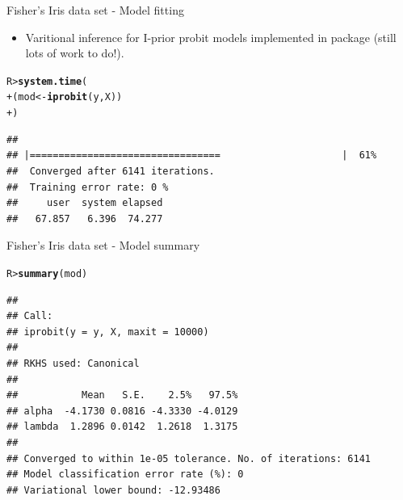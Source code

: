 \documentclass{beamer}\usepackage[]{graphicx}\usepackage[]{color}
\makeatletter
\newcommand{\hlstd}[1]{\textcolor[rgb]{0.345,0.345,0.345}{#1}}%
\newcommand{\hlkwb}[1]{\textcolor[rgb]{0.69,0.353,0.396}{#1}}%
\newcommand{\hlkwd}[1]{\textcolor[rgb]{0.737,0.353,0.396}{\textbf{#1}}}%
\newenvironment{kframe}{%
 \def\at@end@of@kframe{}%
 \ifinner\ifhmode%
  \def\at@end@of@kframe{\end{minipage}}%
  \begin{minipage}{\columnwidth}%
 \fi\fi%
 \def\FrameCommand##1{\hskip\@totalleftmargin \hskip-\fboxsep
 \colorbox{shadecolor}{##1}\hskip-\fboxsep
     \hskip-\linewidth \hskip-\@totalleftmargin \hskip\columnwidth}%
 \MakeFramed {\advance\hsize-\width
   \@totalleftmargin\z@ \linewidth\hsize
   \@setminipage}}%
 {\par\unskip\endMakeFramed%
 \at@end@of@kframe}
\newenvironment{knitrout}{}{} %
\makeatother
\begin{document}
\begin{frame}[fragile]{Fisher's Iris data set - Model fitting}
\vspace{-13pt}
\begin{itemize}
\item Varitional inference for I-prior probit models implemented in  package  (still lots of work to do!).
\end{itemize}
\begin{knitrout}\small
{}\color{fgcolor}\begin{kframe}
\begin{alltt}
\hlstd{R> }\hlkwd{system.time}\hlstd{(}
\hlstd{+ }  \hlstd{(mod} \hlkwb{<-} \hlkwd{iprobit}\hlstd{(y, X))}
\hlstd{+ }\hlstd{)}
\end{alltt}
\end{kframe}
\end{knitrout}
\vspace{-25pt}
\begin{knitrout}\small
{}\color{fgcolor}\begin{kframe}
\begin{alltt}
\vspace{0.8em}
\end{alltt}
\end{kframe}
\end{knitrout}
\vspace{-25pt}
\begin{knitrout}\small
{}\color{fgcolor}\begin{kframe}
\begin{verbatim}
## 
## |=================================                     |  61%
##  Converged after 6141 iterations.
##  Training error rate: 0 %
##     user  system elapsed
##   67.857   6.396  74.277
\end{verbatim}
\end{kframe}
\end{knitrout}

\end{frame}

\begin{frame}[fragile]{Fisher's Iris data set - Model summary}
\begin{knitrout}\small
{}\color{fgcolor}\begin{kframe}
\begin{alltt}
\hlstd{R> }\hlkwd{summary}\hlstd{(mod)}
\end{alltt}
\begin{verbatim}
## 
## Call:
## iprobit(y = y, X, maxit = 10000)
## 
## RKHS used: Canonical 
## 
##           Mean   S.E.    2.5%   97.5%
## alpha  -4.1730 0.0816 -4.3330 -4.0129
## lambda  1.2896 0.0142  1.2618  1.3175
## 
## Converged to within 1e-05 tolerance. No. of iterations: 6141
## Model classification error rate (%): 0
## Variational lower bound: -12.93486
\end{verbatim}
\end{kframe}
\end{knitrout}
\end{frame}
\end{document}
